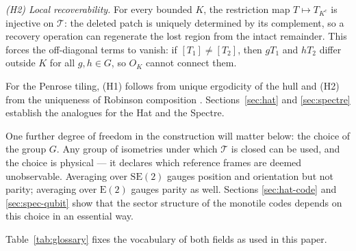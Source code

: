 \documentclass[a4paper,unpublished]{quantumarticle}
\theoremstyle{remark}
\newcommand{\Etwo}{\mathrm{E}(2)}
\newcommand{\SEtwo}{\mathrm{SE}(2)}
\begin{document}
\emph{(H2) Local recoverability.} For every bounded $K$, the
restriction map $T \mapsto T_{K^{c}}$ is injective on $\mathcal{T}$:
the deleted patch is uniquely determined by its complement, so a
recovery operation can regenerate the lost region from the intact
remainder. This
forces the off-diagonal terms to vanish: if $[T_{1}] \neq [T_{2}]$,
then $g T_{1}$ and $h T_{2}$ differ outside $K$ for all $g, h \in G$,
so $O_{K}$ cannot connect them.

For the Penrose tiling, (H1) follows from unique ergodicity of the
hull and (H2) from the uniqueness of Robinson composition
\cite{LiBoyle2024}. Sections~\ref{sec:hat} and \ref{sec:spectre}
establish the analogues for the Hat and the Spectre.

One further degree of freedom in the construction will matter below:
the choice of the group $G$. Any group of isometries under which
$\mathcal{T}$ is closed can be used, and the choice is physical ---
it declares which reference frames are deemed unobservable. Averaging
over $\SEtwo$ gauges position and orientation but not parity;
averaging over $\Etwo$ gauges parity as well. Sections
\ref{sec:hat-code} and \ref{sec:spec-qubit} show that the sector
structure of the monotile codes depends on this choice in an
essential way.

Table~\ref{tab:glossary} fixes the vocabulary of both fields as used
in this paper.
\end{document}
